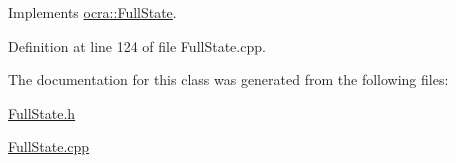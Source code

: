 Implements \hyperlink{classocra_1_1FullState_a24723b4a382c2bf51e6c32cbd1bd7b06}{ocra\+::\+Full\+State}.



Definition at line 124 of file Full\+State.\+cpp.



The documentation for this class was generated from the following files\+:\begin{DoxyCompactItemize}
\item 
\hyperlink{FullState_8h}{Full\+State.\+h}\item 
\hyperlink{FullState_8cpp}{Full\+State.\+cpp}\end{DoxyCompactItemize}
